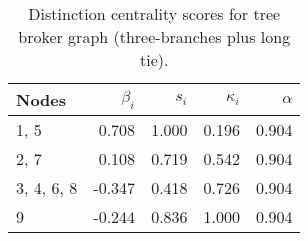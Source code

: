 \begin{table}
\centering
\caption{\label{tab:treelong3}Distinction centrality scores for tree broker graph (three-branches plus long tie).}
\centering
\begin{tabular}[t]{lrrrr}
\toprule
Nodes & $\beta_i$ & $s_i$ & $\kappa_i$ & $\alpha$\\
\midrule
1, 5 & 0.708 & 1.000 & 0.196 & 0.904\\
2, 7 & 0.108 & 0.719 & 0.542 & 0.904\\
3, 4, 6, 8 & -0.347 & 0.418 & 0.726 & 0.904\\
9 & -0.244 & 0.836 & 1.000 & 0.904\\
\bottomrule
\end{tabular}
\end{table}
